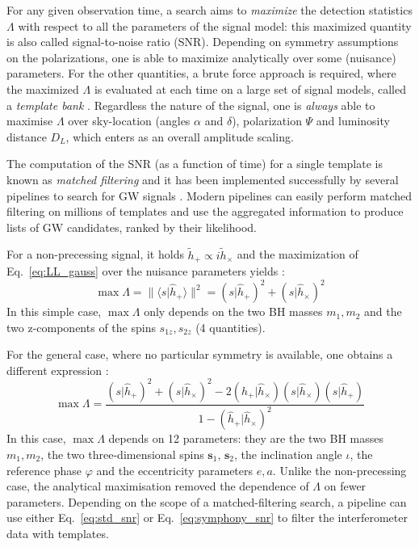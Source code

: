 \documentclass[twocolumn,showpacs,preprintnumbers,nofootinbib,prd,
superscriptaddress,10pt]{revtex4-2}
\newcommand{\scalar}[2]{\langle #1|#2 \rangle}
\newcommand{\rescalar}[2]{( #1 |#2 )}
\begin{document}
For any given observation time, a search aims to {\it maximize} the detection statistics $\Lambda$ with respect to all the parameters of the signal model: this maximized quantity is also called signal-to-noise ratio (SNR).
Depending on symmetry assumptions on the polarizations, one is able to maximize analytically over some (nuisance) parameters.
For the other quantities, a brute force approach is required, where the maximized $\Lambda$ is evaluated at each time on a large set of signal models, called a {\it template bank} \cite{PhysRevD.77.104017, Mukherjee:2018yra}.
Regardless the nature of the signal, one is {\it always} able to maximise $\Lambda$ over sky-location (angles $\alpha$ and $\delta$), polarization $\Psi$ and luminosity distance $D_L$, which enters as an overall amplitude scaling.

The computation of the SNR (as a function of time) for a single template is known as {\it matched filtering} and it has been implemented successfully by several pipelines to search for GW signals \cite{Privitera:2013xza, Usman:2015kfa, Capano:2016dsf, PhysRevD.95.042001, Nitz:2017svb, gstlal_paper2, Aubin:2020goo, Chu:2020pjv}. Modern pipelines can easily perform matched filtering on millions of templates and use the aggregated information to produce lists of GW candidates, ranked by their likelihood.

For a non-precessing signal, it holds $\tilde{h}_+ \propto i\tilde{h}_\times$ and the maximization of Eq.~\eqref{eq:LL_gauss} over the nuisance parameters yields \cite{Maggiore:2007ulw}:
\begin{equation}\label{eq:std_snr}
	\max \Lambda = \lVert \scalar{s}{\hat{h}_+} \rVert^2 = \rescalar{s}{\hat{h}_+}^2 + \rescalar{s}{\hat{h}_\times}^2
\end{equation}
In this simple case, $\max\Lambda$ only depends on the two BH masses $m_1, m_2$ and the two z-components of the spins $s_{1z}, s_{2z}$ (4 quantities).

For the general case, where no particular symmetry is available, one obtains a different expression \cite{Harry:2017weg}:
\begin{equation}\label{eq:symphony_snr}
	\max \Lambda = \frac{ \rescalar{s}{\hat{h}_+}^2 + \rescalar{s}{\hat{h}_\times}^2 -2\rescalar{\hat{h}_+}{\hat{h}_\times}\rescalar{s}{\hat{h}_\times}\rescalar{s}{\hat{h}_+}}{1- \rescalar{\hat{h}_+}{\hat{h}_\times}^2}
\end{equation}
In this case, $\max\Lambda$ depends on 12 parameters: they are the two BH masses $m_1, m_2$, the two three-dimensional spins $\mathbf{s}_1$, $\mathbf{s}_2$, the inclination angle $\iota$, the reference phase $\varphi$ and the eccentricity parameters $e, a$.
Unlike the non-precessing case, the analytical maximisation removed the dependence of $\Lambda$ on fewer parameters.
Depending on the scope of a matched-filtering search, a pipeline can use either Eq.~\eqref{eq:std_snr} or Eq.~\eqref{eq:symphony_snr} to filter the interferometer data with templates.
\end{document}

